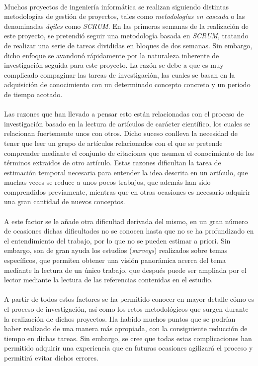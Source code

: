 \documentclass{subfiles}
\begin{document}
    \paragraph{}
    Muchos proyectos de ingeniería informática se realizan siguiendo distintas metodologías de gestión de proyectos, tales como \emph{metodologías en cascada} o las denominadas \emph{ágiles} como \emph{SCRUM}. En las primeras semanas de la realización de este proyecto, se pretendió seguir una metodología basada en \emph{SCRUM}, tratando de realizar una serie de tareas divididas en bloques de dos semanas. Sin embargo, dicho enfoque se avandonó rápidamente por la naturaleza inherente de investigación seguida para este proyecto. La razón se debe a que es muy complicado compaginar las tareas de investigación, las cuales se basan en la adquisición de conocimiento con un determinado concepto concreto y un periodo de tiempo acotado.

    \paragraph{}
    Las razones que han llevado a pensar esto están relacionadas con el proceso de investigación basado en la lectura de artículos de carácter científico, los cuales se relacionan fuertemente unos con otros. Dicho suceso conlleva la necesidad de tener que leer un grupo de artículos relacionados con el que se pretende comprender mediante el conjunto de citaciones que asumen el conocimiento de los términos extraidos de otro artículo. Estas razones dificultan la tarea de estimación temporal necesaria para entender la idea descrita en un artículo, que muchas veces se reduce a unos pocos trabajos, que además han sido comprendidos previamente, mientras que en otras ocasiones es necesario adquirir una gran cantidad de nuevos conceptos.

    \paragraph{}
    A este factor se le añade otra dificultad derivada del mismo, en un gran número de ocasiones dichas dificultades no se conocen hasta que no se ha profundizado en el entendimiento del trabajo, por lo que no se pueden estimar a priori. Sin embargo, son de gran ayuda los estudios (\emph{surveys}) realizados sobre temas específicos, que permiten obtener una visión panorámica acerca del tema mediante la lectura de un único trabajo, que después puede ser ampliada por el lector mediante la lectura de las referencias contenidas en el estudio.

    \paragraph{}
    A partir de todos estos factores se ha permitido conocer en mayor detalle cómo es el proceso de investigación, así como los retos metodológicos que surgen durante la realización de dichos proyectos. Ha habido muchos puntos que se podrían haber realizado de una manera más apropiada, con la consiguiente reducción de tiempo en dichas tareas. Sin embargo, se cree que todas estas complicaciones han permitido adquirir una experiencia que en futuras ocasiones agilizará el proceso y permitirá evitar dichos errores.
\end{document}
